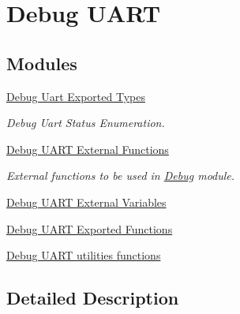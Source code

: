 \hypertarget{group___debug___uart}{}\section{Debug U\+A\+RT}
\label{group___debug___uart}
\subsection*{Modules}
\begin{DoxyCompactItemize}
\item 
\hyperlink{group___debug___uart___exported___types}{Debug Uart Exported Types}
\begin{DoxyCompactList}\small\item\em Debug Uart Status Enumeration. \end{DoxyCompactList}\item 
\hyperlink{group___debug___u_a_r_t___external___functions}{Debug U\+A\+R\+T External Functions}
\begin{DoxyCompactList}\small\item\em External functions to be used in \hyperlink{group___debug}{Debug} module. \end{DoxyCompactList}\item 
\hyperlink{group___debug___u_a_r_t___external___variables}{Debug U\+A\+R\+T External Variables}
\item 
\hyperlink{group___debug___uart___exported___functions}{Debug U\+A\+R\+T Exported Functions}
\item 
\hyperlink{group___debug___uart___exported___functions___group2}{Debug U\+A\+R\+T utilities functions}
\end{DoxyCompactItemize}


\subsection{Detailed Description}
